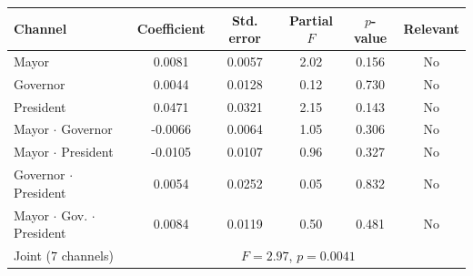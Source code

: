 \begin{tabular}{@{}lccccc@{}}
\toprule
Channel & Coefficient & Std. error & Partial $F$ & $p$-value & Relevant \\
\midrule
Mayor & 0.0081 & 0.0057 & 2.02 & 0.156 & No \\
Governor & 0.0044 & 0.0128 & 0.12 & 0.730 & No \\
President & 0.0471 & 0.0321 & 2.15 & 0.143 & No \\
Mayor $\cdot$ Governor & -0.0066 & 0.0064 & 1.05 & 0.306 & No \\
Mayor $\cdot$ President & -0.0105 & 0.0107 & 0.96 & 0.327 & No \\
Governor $\cdot$ President & 0.0054 & 0.0252 & 0.05 & 0.832 & No \\
Mayor $\cdot$ Gov. $\cdot$ President & 0.0084 & 0.0119 & 0.50 & 0.481 & No \\
\midrule
Joint ($7$ channels) & \multicolumn{5}{c}{$F=2.97$, $p=0.0041$} \\
\bottomrule
\end{tabular}
